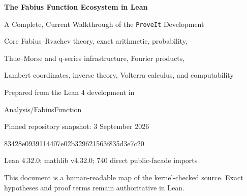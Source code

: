 \documentclass[11pt,oneside]{report}
\theoremstyle{definition}
\theoremstyle{remark}
\begin{document}
\hypersetup{pageanchor=false}
\begin{titlepage}
\centering
\vspace*{1.25cm}
{\Huge\bfseries\color{LeanDark} The Fabius Function Ecosystem in Lean\par}
\vspace{0.42cm}
{\LARGE\color{LeanBlue} A Complete, Current Walkthrough of the \texttt{ProveIt} Development\par}
\vspace{1.0cm}
\vspace{0.95cm}

{\Large Core Fabius--Rvachev theory, exact arithmetic, probability,\par
Thue--Morse and q-series infrastructure, Fourier products,\par
Lambert coordinates, inverse theory, Volterra calculus, and computability\par}
\vfill
{\large Prepared from the Lean 4 development in\par}
\vspace{0.2cm}
{\ttfamily\large Analysis/FabiusFunction\par}
\vspace{0.65cm}
{\large Pinned repository snapshot: 3 September 2026\par}
\vspace{0.16cm}
{\ttfamily\small 83428e0939114407e02b329621563f835d3e7c20\par}
\vspace{0.2cm}
{\small Lean 4.32.0; mathlib v4.32.0; 740 direct public-facade imports\par}
\vfill
{\small This document is a human-readable map of the kernel-checked source.  Exact hypotheses and proof terms remain authoritative in Lean.\par}
\end{titlepage}
\hypersetup{pageanchor=true}

\end{document}

